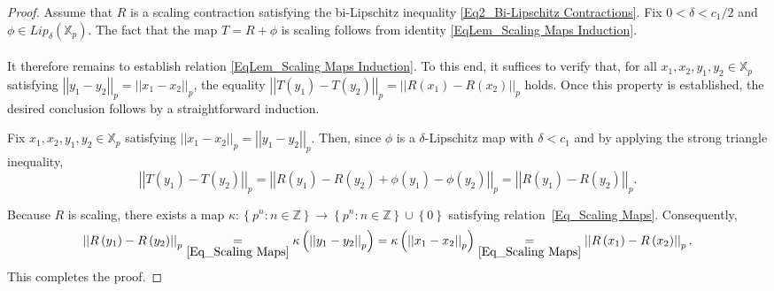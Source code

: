 \documentclass[a4paper, 12pt]{article}
\theoremstyle{definition}
\begin{document}
	\begin{proof}
		
		Assume that $R$ is a scaling contraction satisfying the bi-Lipschitz inequality \eqref{Eq2_Bi-Lipschitz Contractions}. Fix $0  < \delta  <  c_{1}/2$ and $\phi \in Lip_{\delta} \left(  \mathbb{X}_{p}  \right) $. The fact that the map $T = R + \phi$ is scaling follows from identity \eqref{EqLem_Scaling Maps Induction}. 
		
		
		\paragraph{}
		It therefore remains to establish relation \eqref{EqLem_Scaling Maps Induction}. To this end, it suffices to verify that, for all $x_{1}, x_{2}, y_{1}, y_{2} \in \mathbb{X}_{p}$ satisfying $ \left| \left|  y_{1} - y_{2}  \right|  \right|_{p} =  \left| \left|  x_{1} - x_{2}  \right|  \right|_{p}$, the equality $  \left| \left|  T \left(  y_{1}  \right)  - T \left(  y_{2}  \right)   \right|  \right|_{p} =  \left| \left|  R \left(  x_{1}  \right)  - R \left(  x_{2}  \right)   \right|  \right|_{p} $ holds. 
		Once this property is established, the desired conclusion follows by a straightforward induction. 
		
		Fix $x_{1}, x_{2}, y_{1}, y_{2}\in \mathbb{X}_{p}$ satisfying $ \left| \left|  x_{1} - x_{2}  \right|  \right|_{p} =  \left| \left|  y_{1} - y_{2}  \right|  \right|_{p}$.  Then, since $\phi$ is a $\delta$-Lipschitz map with $\delta < c_{1}$ and by applying the strong triangle inequality,  
		$$ \left| \left|  T \left(  y_{1}  \right)  - T \left(  y_{2}  \right)   \right|  \right|_{p}    =    \left| \left|  R \left(   y_{1}  \right)  - R \left(  y_{2}  \right)  + \phi \left(  y_{1}  \right)  - \phi \left(  y_{2}  \right)   \right|  \right|_{p}   =    \left| \left|  R \left(  y_{1}  \right)  - R \left(  y_{2}  \right)   \right|  \right|_{p} . $$ 
		
		
		Because $R$ is scaling, there exists a map $\kappa:  \left\{  p^{n}:   n \in \mathbb{Z}  \right\}  \to  \left\{  p^{n} :   n \in \mathbb{Z}  \right\}  \cup  \left\{  0  \right\}  $ satisfying relation~\eqref{Eq_Scaling Maps}. Consequently,    
		$$  \left| \left|  R \left(  y_{1}  \right)  - R \left(  y_{2}  \right)   \right|  \right|_{p}   \underset{\eqref{Eq_Scaling Maps}}{=}   \kappa \left(   \left| \left|  y_{1} - y_{2}  \right|  \right|_{p}  \right)    =   \kappa \left(   \left| \left|  x_{1} - x_{2}  \right|  \right|_{p}  \right)    \underset{\eqref{Eq_Scaling Maps}}{=}    \left| \left|  R \left(  x_{1}  \right)  - R \left(  x_{2}  \right)   \right|  \right|_{p}. $$
		This completes the proof. 
		
		
		
	\end{proof}
	
\end{document}
